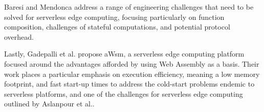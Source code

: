 Baresi and Mendonca\cite{baresiServerlessPlatformEdge2019} address a range of engineering challenges that need to be solved for serverless edge computing, focusing particularly on function composition, challenges of stateful computations, and potential protocol overhead.

Lastly, Gadepalli et al. \cite{gadepalliChallengesOpportunitiesEfficient2019} propose aWsm, a serverless edge computing platform focused around the advantages afforded by using Web Assembly as a basis.
Their work places a particular emphasis on execution efficiency, meaning a low memory footprint, and fast start-up times to address the cold-start problems endemic to serverless platforms, and one of the challenges for serverless edge computing outlined by Aslanpour et al.\cite{aslanpourServerlessEdgeComputing2021}.

